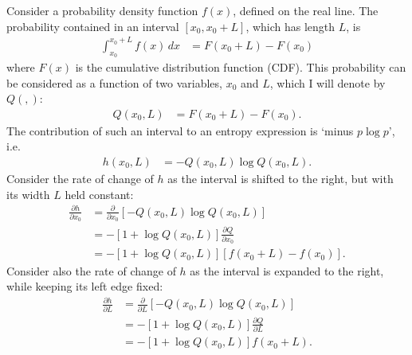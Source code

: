 \documentclass[entropy,article,accept,oneauthor,pdftex,10pt,a4paper]{mdpi}
\begin{document}
Consider a probability density function $f(x)$, defined on the real
line. The probability contained in an interval
$[x_0, x_0 + L]$, which has length $L$, is
\begin{align}
\int_{x_0}^{x_0 + L} f(x) \, dx &= F(x_0 + L) - F(x_0)
\end{align}
where $F(x)$ is the cumulative distribution function (CDF).
This probability can be considered as a function of two variables,
$x_0$ and $L$, which I will denote by $Q(,)$:
\begin{align}
Q(x_0, L) &= F(x_0 + L) - F(x_0).
\end{align}
The contribution of such an interval to an entropy expression
is `minus $p\log p$', i.e.
\begin{align}
h(x_0, L) &= -Q(x_0, L) \log Q(x_0, L).
\end{align}
Consider the rate of change of $h$ as the interval is shifted to
the right, but with its width $L$ held constant:
\begin{align}
\frac{\partial h}{\partial x_0} &= \frac{\partial}{\partial x_0}
    \left[-Q(x_0, L) \log Q(x_0, L)\right] \\
    &= -\left[1 + \log Q(x_0, L)\right]\frac{\partial Q}{\partial x_0} \\
    &= -\left[1 + \log Q(x_0, L)\right]\left[f(x_0 + L) - f(x_0)\right].
\end{align}
Consider also the rate of change of $h$ as the interval is
expanded to the right, while keeping its left edge fixed:
\begin{align}
\frac{\partial h}{\partial L} &= \frac{\partial}{\partial L}
    \left[-Q(x_0, L) \log Q(x_0, L)\right] \\
    &= -\left[1 + \log Q(x_0, L)\right]\frac{\partial Q}{\partial L} \\
    &= -\left[1 + \log Q(x_0, L)\right]f(x_0 + L).
\end{align}
\end{document}
